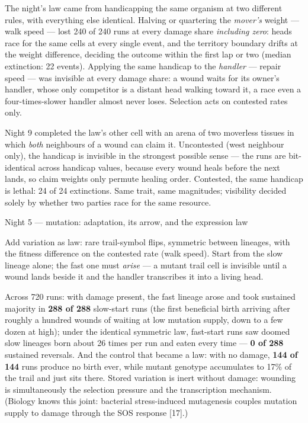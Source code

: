 The night's law came from handicapping the same organism at two
different rules, with everything else identical. Halving or
quartering the {\it mover's} weight --- walk speed --- lost 240 of
240 runs at every damage share {\it including zero}: heads race
for the same cells at every single event, and the territory
boundary drifts at the weight difference, deciding the outcome
within the first lap or two (median extinction: 22 events).
Applying the same handicap to the {\it handler} --- repair speed
--- was invisible at every damage share: a wound waits for its
owner's handler, whose only competitor is a distant head walking
toward it, a race even a four-times-slower handler almost never
loses.  Selection acts on contested rates
only.

Night 9 completed the law's other cell with an arena of two
moverless tissues in which {\it both} neighbours of a wound can
claim it. Uncontested (west neighbour only), the handicap is
invisible in the strongest possible sense --- the runs are
bit-identical across handicap values, because every wound heals
before the next lands, so claim weights only permute healing
order. Contested, the same handicap is lethal: 24 of 24
extinctions. Same trait, same magnitudes; visibility decided
solely by whether two parties race for the same resource.

\secc Night 5 --- mutation: adaptation, its arrow, and the expression law

Add variation as law: rare trail-symbol flips, symmetric between
lineages, with the fitness difference on the contested rate (walk
speed). Start from the slow lineage alone; the fast one must {\it
arise} --- a mutant trail cell is invisible until a wound lands
beside it and the handler transcribes it into a living head.

Across 720 runs: with damage present, the fast lineage arose and
took sustained majority in {\bf 288 of 288} slow-start runs (the
first beneficial birth arriving after roughly a hundred wounds of
waiting at low mutation supply, down to a few dozen at high); under
the identical symmetric law, fast-start runs saw doomed slow
lineages born about 26 times per run and eaten every time --- {\bf
0 of 288} sustained reversals. And the control that became a law:
with no damage, {\bf 144 of 144} runs produce no birth ever, while
mutant genotype accumulates to 17\% of the trail and just sits
there.  Stored variation is inert without damage:
wounding is simultaneously the selection pressure and the
transcription mechanism. (Biology knows this joint: bacterial
stress-induced mutagenesis couples mutation supply to damage
through the SOS response [17].)

